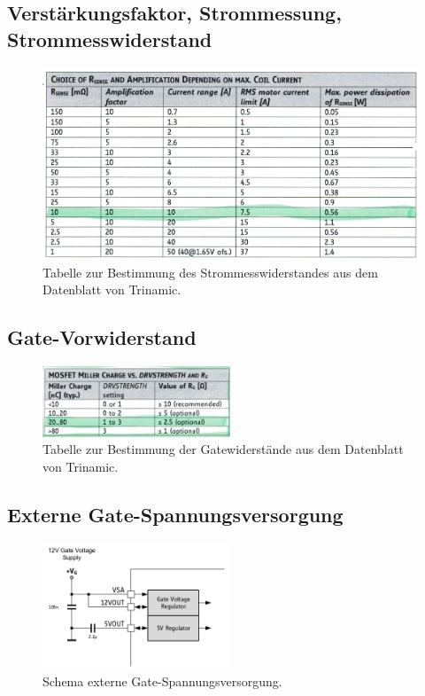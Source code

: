 \begin{appendix}
\newpage

\subsection{Verstärkungsfaktor, Strommessung, Strommesswiderstand}

\begin{figure}[h!]
	\centering
	\includegraphics[width=\textwidth]{graphics/Tabelle_Shunts.png}
	\caption{Tabelle zur Bestimmung des Strommesswiderstandes aus dem Datenblatt von Trinamic.}
	\label{fig:Tabelle_Shunts}
\end{figure}

\subsection{Gate-Vorwiderstand}

\begin{figure}[h!]
	\centering
	\includegraphics[width=0.5\textwidth]{graphics/Tabelle_Gatewiderstaende.png}
	\caption{Tabelle zur Bestimmung der Gatewiderstände aus dem Datenblatt von Trinamic.}
	\label{fig:Tabelle_Gatewiderstaende}
\end{figure}

\subsection{Externe Gate-Spannungsversorgung}

\begin{figure}[h!]
	\centering
	\includegraphics[width=0.5\textwidth]{graphics/Schema_Gate_Treiber_Gatespannung}
	\caption{Schema externe Gate-Spannungsversorgung.}
	\label{fig:Schema_Gate_Treiber_Gatespannung}
\end{figure}


\end{appendix}

